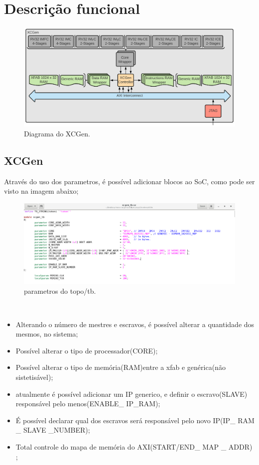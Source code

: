 \section{Descrição funcional} %
\label{sec:descricaofuncional}
\begin{figure}[!htb]
  \includegraphics[width=\linewidth]{diagrams/XCGen2.png}
  \caption{Diagrama do XCGen.}
  \label{fig:top}
\end{figure}

\subsection{XCGen}
Através do uso dos parametros, é possível adicionar blocos ao SoC, como pode ser visto na imagem abaixo;
\begin{figure}[!htb]
  \includegraphics[width=\linewidth]{diagrams/tb.png}
  \caption{parametros do topo/tb.}
  \label{fig:top}
\end{figure}
\\
\begin{itemize}
  \item Alterando o número de mestres e escravos, é possível alterar a quantidade dos mesmos, no sistema;
  \item Possível alterar o tipo de processador(CORE);
  \item Possível alterar o tipo de memória(RAM)entre a  xfab e genérica(não sistetisável);
  \item atualmente é possível adicionar um IP generico, e definir o escravo(SLAVE) responsável pelo menos(ENABLE\_ IP\_RAM);
  \item É possível declarar qual dos escravos será responsável pelo novo IP(IP\_ RAM \_ SLAVE \_NUMBER);
  \item Total controle do mapa de memória do AXI(START/END\_ MAP \_ ADDR) ;
\end{itemize}

